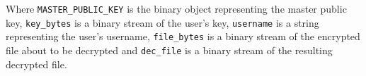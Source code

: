 Where \texttt{MASTER\_PUBLIC\_KEY} is the binary object representing the master public key, \texttt{key\_bytes} is a binary stream of the user's key, \texttt{username} is a string representing the user's username, \texttt{file\_bytes} is a binary stream of the encrypted file about to be decrypted and \texttt{dec\_file} is a binary stream of the resulting decrypted file.
